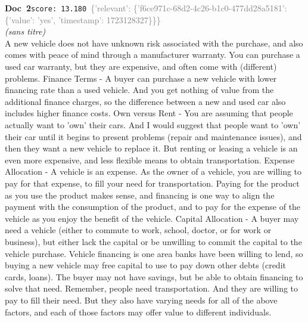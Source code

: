 \documentclass[a4paper,11pt]{article}
\begin{document}
\begin{docenv}
{\footnotesize\textcolor{doccolor}{\textbf{Doc~2}}}\hfill{\tiny\texttt{score:~13.180}}\ {\tiny\textcolor{gray}{\{'relevant': \{'f6ce971c-68d2-4c26-b1c0-477dd28a5181': \{'value': 'yes', 'timestamp': 1723128327\}\}\}}}\\[3pt]
{\small\textit{(sans titre)}}\\[2pt]
\vspace{2pt}
{\footnotesize 
A new vehicle does not have unknown risk associated with the purchase, and also comes with peace of mind through a manufacturer warranty. You can purchase a used car warranty, but they are expensive, and often come with (different) problems. Finance Terms - A buyer can purchase a new vehicle with lower financing rate than a used vehicle. And you get nothing of value from the additional finance charges, so the difference between a new and used car also includes higher finance costs. Own versus Rent - You are assuming that people actually want to 'own' their cars. And I would suggest that people want to 'own' their car until it begins to present problems (repair and maintenance issues), and then they want a new vehicle to replace it. But renting or leasing a vehicle is an even more expensive, and less flexible means to obtain transportation. Expense Allocation - A vehicle is an expense. As the owner of a vehicle, you are willing to pay for that expense, to fill your need for transportation. Paying for the product as you use the product makes sense, and financing is one way to align the payment with the consumption of the product, and to pay for the expense of the vehicle as you enjoy the benefit of the vehicle. Capital Allocation - A buyer may need a vehicle (either to commute to work, school, doctor, or for work or business), but either lack the capital or be unwilling to commit the capital to the vehicle purchase. Vehicle financing is one area banks have been willing to lend, so buying a new vehicle may free capital to use to pay down other debts (credit cards, loans). The buyer may not have savings, but be able to obtain financing to solve that need. Remember, people need transportation. And they are willing to pay to fill their need. But they also have varying needs for all of the above factors, and each of those factors may offer value to different individuals.}
\end{docenv}
\end{document}

